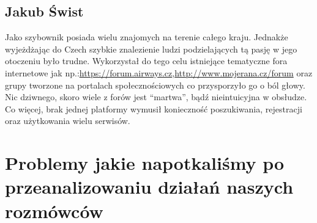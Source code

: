 \documentclass{article}
\begin{document}
\subsection{Jakub Świst}
Jako szybownik posiada wielu znajomych na terenie całego kraju. Jednakże wyjeżdżając do Czech szybkie znalezienie ludzi podzielających tą pasję w jego otoczeniu było trudne. Wykorzystał do tego celu istniejące tematyczne fora internetowe jak np.:\url{https://forum.airways.cz},\url{http://www.mojerana.cz/forum} oraz grupy tworzone na portalach społecznościowych co przysporzyło go o ból głowy. Nic dziwnego, skoro wiele z forów jest “martwa”, bądź nieintuicyjna w obsłudze. Co więcej, brak jednej platformy wymusił konieczność poszukiwania, rejestracji oraz użytkowania wielu serwisów.

\section{Problemy jakie napotkaliśmy po przeanalizowaniu działań naszych rozmówców} \newline\newline
\end{document}
